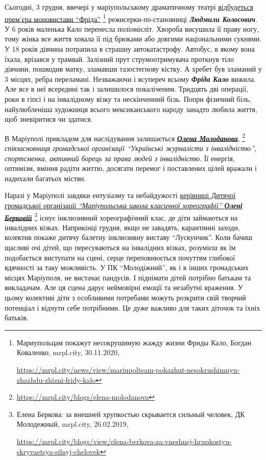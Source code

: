 
Сьогодні, 3 грудня, ввечері у маріупольському драматичному театрі \href{https://mrpl.city/news/view/mariupoltsam-pokazhut-nesokrushimuyu-zhazhdu-zhizni-fridy-kalo}{відбудеться
прем'єра моновистави \enquote{Фріда}}%
\footnote{Мариупольцам покажут несокрушимую жажду жизни Фриды Кало, Богдан Коваленко, mrpl.city, 30.11.2020, \par%
\url{https://mrpl.city/news/view/mariupoltsam-pokazhut-nesokrushimuyu-zhazhdu-zhizni-fridy-kalo}
}
режисерки-по\hyp{}становниці \emph{\textbf{Людмили Колосович}}. У 6
років маленька Кало перенесла поліомієліт. Хвороба висушила її праву ногу, тому
жінка все життя ховала її під брюками або довгими національними сукнями. У 18
років дівчина потрапила в страшну автокатастрофу. Автобус, в якому вона їхала,
врізався у трамвай. Залізний прут струмоотримувача проткнув тіло дівчини,
пошкодив матку, зламавши тазостегнову кістку. А хребет був зламаний у 3 місцях,
ребра переламані. Незважаючи і всупереч всьому \emph{\textbf{Фріда Кало}} вижила. Але все в неї
всередині так і залишилося покаліченим. Тридцять дві операції, роки в гіпсі і
на інвалідному візку та нескінченний біль. Попри фізичний біль, найулюбленіша
художниця всього мексиканського народу занадто любила життя, щоб зневіритися чи
здатися.

В Маріуполі прикладом для наслідування залишається \href{https://mrpl.city/blogs/elena-molodanova}{\emph{\textbf{Олена Молоданова}}},
\footnote{\url{https://mrpl.city/blogs/elena-molodanova}}
\emph{співзасновниця громадської організації \enquote{Українські журналісти з інвалідністю}},
\emph{спортсменка, активний борець за права людей з інвалідністю}. Її енергія,
оптимізм, вміння радіти життю, досягати перемог і поставлених цілей вражали і
надихали багатьох містян.


Наразі у Маріуполі завдяки ентузіазму та небайдужості \href{https://mrpl.city/blogs/view/elena-berkova-za-vneshnej-hrupkostyu-skryvaetsya-silnyj-chelovek}{керівниці Дитячої
громадської організації \emph{\enquote{Маріупольська школа класичної хореографії} \textbf{Олені
Берковій}}}%
\footnote{Елена Беркова: за внешней хрупкостью скрывается сильный человек, ДК Молодежный, mrpl.city, 26.02.2019, \par%
\url{https://mrpl.city/blogs/view/elena-berkova-za-vneshnej-hrupkostyu-skryvaetsya-silnyj-chelovek}%
}
існує інклюзивний хореографічний клас, де діти займаються на
інвалідних візках. Наприкінці грудня, якщо не завадять, карантинні заходи,
колектив покаже дитячу балетну інклюзивну виставу  \enquote{Лускунчик}. Коли бачиш
щасливі очі дітей, що пересуваються на інвалідних візках, розумієш як їм
подобається виступати на сцені, серце переповнюється почуттям глибокої
вдячності за таку можливість. У ПК \enquote{Молодіжний}, як і в інших громадських
місцях Маріуполя, не вистачає пандусів. І піднімати дітей потрібно батькам та
викладачам. Але ця сцена дарує неймовірні емоції та незабутні враження. У цьому
колективі діти з особливими потребами можуть розкрити свій творчий потенціал і
відчути себе потрібними. Це дуже важливо для таких діточок та їхніх батьків.

